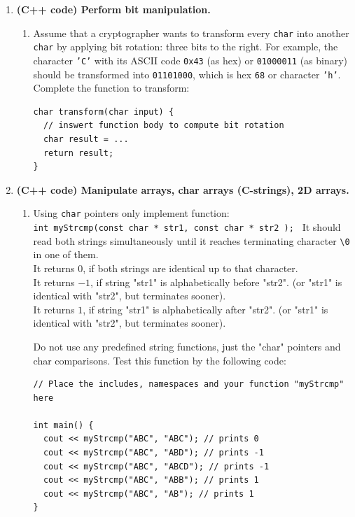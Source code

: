 \documentclass[a4paper,12pt]{article}
\begin{document}
\begin{enumerate}[label=1.\Alph*.]
\item {\bf (C++ code) Perform bit manipulation.}
\begin{enumerate}
\item Assume that a cryptographer wants to transform every 
{\tt char} into another {\tt char} by applying bit rotation: 
three bits to the right. 
For example, the character {\tt 'C'} with its ASCII code 
{\tt 0x43} (as hex) or {\tt 01000011} (as binary) 
should be transformed into {\tt 01101000}, which is 
hex {\tt 68} or character {\tt 'h'}. 
Complete the function to transform: 
\begin{verbatim}
char transform(char input) {
  // inswert function body to compute bit rotation
  char result = ... 
  return result;
}
\end{verbatim}
\end{enumerate}


\item {\bf (C++ code) Manipulate arrays, char arrays (C-strings), 2D arrays.}
\begin{enumerate}
\item Using {\tt char} pointers only implement function:\\ 
{\tt int myStrcmp(const char * str1, const char * str2 ); }
It should read both strings simultaneously until it reaches terminating character
{\tt \textbackslash{}0} in one of them.\\
It returns $0$, if both strings are identical up to that character.\\
It returns $-1$, if string "str1" is alphabetically before "str2".
(or "str1" is identical with "str2", but terminates sooner).\\
It returns $1$, if string "str1" is alphabetically after "str2".
(or "str1" is identical with "str2", but terminates sooner).

Do not use any predefined string functions, just the "char" pointers
and char comparisons. 
Test this function by the following code:
\begin{verbatim}
// Place the includes, namespaces and your function "myStrcmp" here

int main() {
  cout << myStrcmp("ABC", "ABC"); // prints 0
  cout << myStrcmp("ABC", "ABD"); // prints -1
  cout << myStrcmp("ABC", "ABCD"); // prints -1
  cout << myStrcmp("ABC", "ABB"); // prints 1
  cout << myStrcmp("ABC", "AB"); // prints 1
}
\end{verbatim}


\end{enumerate}



\end{enumerate}
\end{document}
